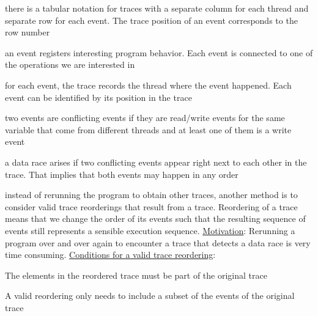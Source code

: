 \documentclass[landscape, a4paper]{article}
\begin{document}
\begin{minipage}[t]{0.2\linewidth}
\begin{betterlist}
		\begin{betterlist}
			\item there is a \alert{tabular notation} for traces with a separate \alert{column} for each \alert{thread} and separate \alert{row} for each \alert{event}. The trace \alert{position} of an event corresponds to the row number
		\end{betterlist}
		\item an \alert{event} registers interesting program behavior. Each event is connected to one of the operations we are interested in
		\begin{betterlist}
			\item for each event, the trace records the \alert{thread} where the event happened. Each event can be identified by its position in the trace
			\item two events are \alert{conflicting events} if they are read/write events for the same variable that come from different threads and at least one of them is a write event
			\item a \alert{data race} arises if two conflicting events appear right next to each other in the trace. That implies that both events may happen in any order
		\end{betterlist}
		\item {}
		\item instead of rerunning the program to obtain other traces, another method is to consider \alert{valid trace reorderings} that result from a trace. Reordering of a trace means that we change the order of its events such that the resulting sequence of events still represents a sensible execution sequence. \underline{Motivation}: Rerunning a program over and over again to encounter a trace that detects a data race is very time consuming. \underline{Conditions for a valid trace reordering}:
		\begin{betterlist}
			\item The elements in the reordered trace must be part of the original trace
			\begin{betterlist}
				\item A valid reordering only needs to include a subset of the events of the original trace
			\end{betterlist}


\end{betterlist}
\end{betterlist}
\end{minipage}
\end{document}

